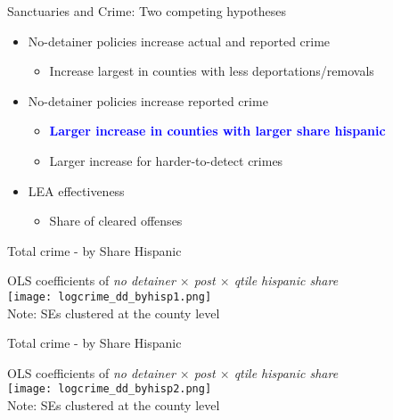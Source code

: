 \documentclass[xcolor=pdftex,dvipsnames,table,handout]{beamer}
\begin{document}
\begin{frame}{Sanctuaries and Crime: Two competing hypotheses}
\begin{itemize}
\item No-detainer policies increase actual and reported crime\vspace{0.10cm}
\begin{itemize}
\item Increase largest in counties with less deportations/removals
\end{itemize}\vspace{0.30cm}
\item No-detainer policies increase reported crime\vspace{0.10cm}
\begin{itemize}
\item \textbf{\textcolor{Blue}{Larger increase in counties with larger share hispanic}}\vspace{0.10cm}
\item Larger increase for harder-to-detect crimes
\end{itemize}\vspace{0.30cm}
\item LEA effectiveness\vspace{0.10cm}
\begin{itemize}
\item Share of cleared offenses
\end{itemize}
\end{itemize}
\end{frame}

\begin{frame}{Total crime - by Share Hispanic}
\footnotesize
\begin{center}
OLS coefficients of \textit{no detainer $\times$ post $\times$ qtile hispanic share}\\
\texttt{[image: logcrime\_dd\_byhisp1.png]}\\
\footnotesize{Note: SEs clustered at the county level}
\end{center}
\end{frame}

\begin{frame}{Total crime - by Share Hispanic}
\footnotesize
\begin{center}
OLS coefficients of \textit{no detainer $\times$ post $\times$ qtile hispanic share}\\
\texttt{[image: logcrime\_dd\_byhisp2.png]}\\
\footnotesize{Note: SEs clustered at the county level}
\end{center}
\end{frame}
\end{document}

